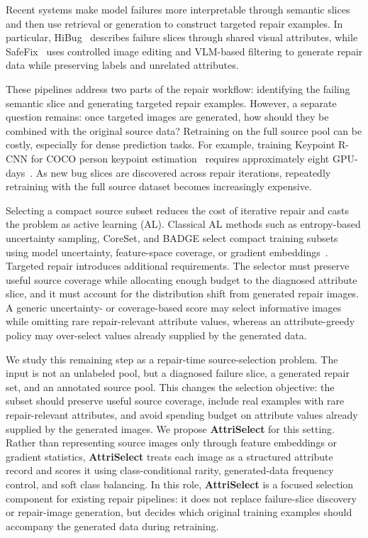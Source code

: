 \documentclass[10pt,twocolumn,letterpaper]{article}
\newcommand{\modelname}{AttriSelect}
\newcommand{\model}{\textcolor{darkteal}{\textbf{\modelname}}\xspace}
\newcommand{\safefix}{SafeFix\xspace}
\newcommand{\hibug}{HiBug\xspace}
\begin{document}
Recent systems make model failures more interpretable through semantic slices and then use retrieval or generation to construct targeted repair examples. In particular, \hibug~\citep{chen2023hibug} describes failure slices through shared visual attributes, while \safefix~\citep{xu2025safefix} uses controlled image editing and VLM-based filtering to generate repair data while preserving labels and unrelated attributes.

These pipelines address two parts of the repair workflow: identifying the failing semantic slice and generating targeted repair examples. However, a separate question remains: once targeted images are generated, how should they be combined with the original source data? Retraining on the full source pool can be costly, especially for dense prediction tasks. For example, training Keypoint R-CNN for COCO person keypoint estimation~\citep{mask-rcnn-2017,lin2014microsoft} requires approximately eight GPU-days~\citep{detectron2modelzoo}. As new bug slices are discovered across repair iterations, repeatedly retraining with the full source dataset becomes increasingly expensive.

Selecting a compact source subset reduces the cost of iterative repair and casts the problem as active learning (AL). Classical AL methods such as entropy-based uncertainty sampling, CoreSet, and BADGE select compact training subsets using model uncertainty, feature-space coverage, or gradient embeddings~\citep{settles2009active,sener2018active,ash2020deep}. Targeted repair introduces additional requirements. The selector must preserve useful source coverage while allocating enough budget to the diagnosed attribute slice, and it must account for the distribution shift from generated repair images. A generic uncertainty- or coverage-based score may select informative images while omitting rare repair-relevant attribute values, whereas an attribute-greedy policy may over-select values already supplied by the generated data.

We study this remaining step as a repair-time source-selection problem. The input is not an unlabeled pool, but a diagnosed failure slice, a generated repair set, and an annotated source pool. This changes the selection objective: the subset should preserve useful source coverage, include real examples with rare repair-relevant attributes, and avoid spending budget on attribute values already supplied by the generated images. We propose \model for this setting. Rather than representing source images only through feature embeddings or gradient statistics, \model treats each image as a structured attribute record and scores it using class-conditional rarity, generated-data frequency control, and soft class balancing. In this role, \model is a focused selection component for existing repair pipelines: it does not replace failure-slice discovery or repair-image generation, but decides which original training examples should accompany the generated data during retraining.
\end{document}
